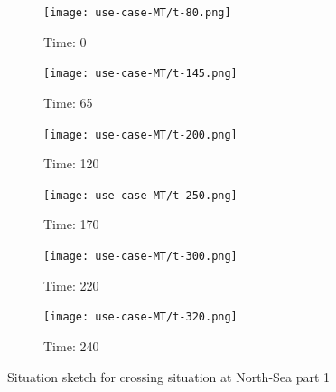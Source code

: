 \clearpage


\begin{figure}[p]
	\centering
	
	\begin{subfigure}{0.49\textwidth}
		\centering
		\texttt{[image: use-case-MT/t-80.png]}
		\caption{Time: 0}
	\end{subfigure}
	\hfill
	\begin{subfigure}{0.49\textwidth}
		\centering
		\texttt{[image: use-case-MT/t-145.png]}
		\caption{Time: 65}
	\end{subfigure}
	
	\medskip \bigskip
	\begin{subfigure}{0.49\textwidth}
		\centering
		\texttt{[image: use-case-MT/t-200.png]}
		\caption{Time: 120}
	\end{subfigure}
	\hfill
	\begin{subfigure}{0.49\textwidth}
		\centering
		\texttt{[image: use-case-MT/t-250.png]}
		\caption{Time: 170}
	\end{subfigure}
	
	\medskip \bigskip
	\begin{subfigure}{0.49\textwidth}
		\centering
		\texttt{[image: use-case-MT/t-300.png]}
		\caption{Time: 220}
	\end{subfigure}
	\hfill
	\begin{subfigure}{0.49\textwidth}
		\texttt{[image: use-case-MT/t-320.png]}
		\caption{Time: 240}
	\end{subfigure}
	
	\caption{Situation sketch for crossing situation at North-Sea part 1}
	\label{fig:use-case-1}
\end{figure}

